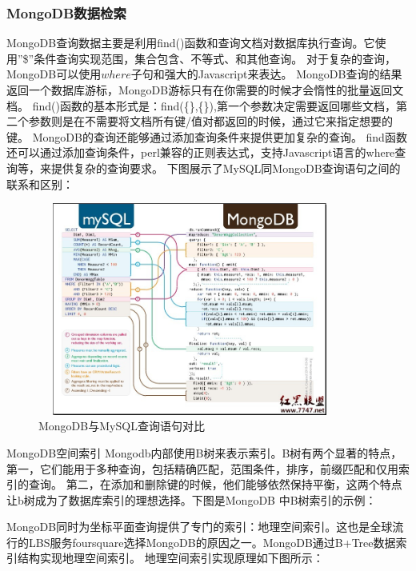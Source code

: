 \documentclass[master]{njnuthesis}
\begin{document}
\subsubsection{MongoDB数据检索}
MongoDB查询数据主要是利用find()函数和查询文档对数据库执行查询。它使用''\$''条件查询实现范围，集合包含、不等式、和其他查询。 
对于复杂的查询，MongoDB可以使用$where$子句和强大的Javascript来表达。
  MongoDB查询的结果返回一个数据库游标，MongoDB游标只有在你需要的时候才会惰性的批量返回文档。
  find()函数的基本形式是：find(\{\},\{\}),第一个参数决定需要返回哪些文档，第二个参数则是在不需要将文档所有键/值对都返回的时候，通过它来指定想要的键。
  MongoDB的查询还能够通过添加查询条件来提供更加复杂的查询。
find函数还可以通过添加查询条件，perl兼容的正则表达式，支持Javascript语言的where查询等，来提供复杂的查询要求。
下图展示了MySQL同MongoDB查询语句之间的联系和区别：

\begin{figure}[!htb]
\begin{center}
\includegraphics[angle=0,width=10cm,height=7cm]{pic//mongodb_Mysql.jpg}
\caption{MongoDB与MySQL查询语句对比}
\label{fig:5}
\end{center}
\end{figure}

MongoDB空间索引
Mongodb内部使用B树来表示索引。B树有两个显著的特点，第一，它们能用于多种查询，包括精确匹配，范围条件，排序，前缀匹配和仅用索引的查询。
第二，在添加和删除键的时候，他们能够依然保持平衡，这两个特点让b树成为了数据库索引的理想选择。下图是MongoDB 中B树索引的示例：

MongoDB同时为坐标平面查询提供了专门的索引：地理空间索引。这也是全球流行的LBS服务foursquare选择MongoDB的原因之一。MongoDB通过B+Tree数据索引结构实现地理空间索引。
地理空间索引实现原理如下图所示：
\end{document}
